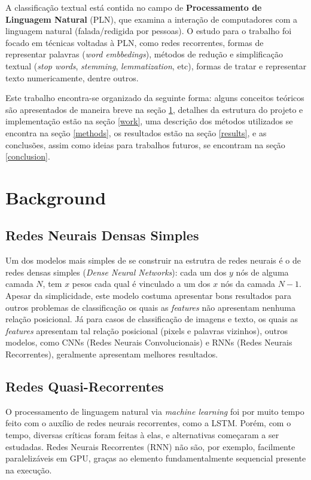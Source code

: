\documentclass[twoside,conference,a4paper]{IEEEtran}
\begin{document}
A classificação textual está contida no campo de \textbf{Processamento de Linguagem Natural} (PLN), que examina a interação de computadores com a linguagem natural (falada/redigida por pessoas). O estudo para o trabalho foi focado em técnicas voltadas à PLN, como redes recorrentes, formas de representar palavras (\textit{word embbedings}), métodos de redução e simplificação textual (\textit{stop words}, \textit{stemming}, \textit{lemmatization}, etc), formas de tratar e representar texto numericamente, dentre outros. 

Este trabalho encontra-se organizado da seguinte forma: alguns conceitos teóricos são apresentados de maneira breve na seção \ref{back}, detalhes da estrutura do projeto e implementação estão na seção \ref{work}, uma descrição dos métodos utilizados se encontra na seção \ref{methods}, os resultados estão na seção \ref{results}, e as conclusões, assim como ideias para trabalhos futuros, se encontram na seção \ref{conclusion}.

\section{Background} \label{back}

\subsection{Redes Neurais Densas Simples}
    Um dos modelos mais simples de se construir na estrutra de redes neurais é o de redes densas simples (\textit{Dense Neural Networks}): cada um dos $y$ nós de alguma camada $N$, tem $x$ pesos cada qual é vinculado a um dos $x$ nós da camada $N-1$. 
    Apesar da simplicidade, este modelo costuma apresentar bons resultados para outros problemas de classificação os quais as \textit{features} não apresentam nenhuma relação posicional. Já para casos de classificação de imagens e texto, os quais as \textit{features} apresentam tal relação posicional (pixels e palavras vizinhos), outros modelos, como CNNs (Redes Neurais Convolucionais) e RNNs (Redes Neurais Recorrentes), geralmente apresentam melhores resultados.
    
\subsection{Redes Quasi-Recorrentes} \label{qrnn_att}
    O processamento de linguagem natural via \textit{machine learning} foi por muito tempo feito com o auxílio de redes neurais recorrentes, como a LSTM. Porém, com o tempo, diversas críticas foram feitas à elas, e alternativas começaram a ser estudadas. Redes Neurais Recorrentes (RNN) não são, por exemplo, facilmente paralelizáveis em GPU, graças ao elemento fundamentalmente sequencial presente na execução.
    
\end{document}
